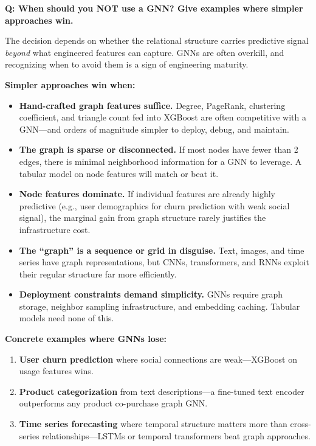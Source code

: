 \begin{interviewq}
\textbf{Q: When should you NOT use a GNN? Give examples where simpler approaches win.}

 \quad {} \quad \badgefreq{\freqmed}

\stronganswer

The decision depends on whether the relational structure carries predictive signal \textit{beyond} what engineered features can capture. GNNs are often overkill, and recognizing when to avoid them is a sign of engineering maturity.

\textbf{Simpler approaches win when:}
\begin{itemize}
    \item \textbf{Hand-crafted graph features suffice.} Degree, PageRank, clustering coefficient, and triangle count fed into XGBoost are often competitive with a GNN---and orders of magnitude simpler to deploy, debug, and maintain.
    \item \textbf{The graph is sparse or disconnected.} If most nodes have fewer than 2 edges, there is minimal neighborhood information for a GNN to leverage. A tabular model on node features will match or beat it.
    \item \textbf{Node features dominate.} If individual features are already highly predictive (e.g., user demographics for churn prediction with weak social signal), the marginal gain from graph structure rarely justifies the infrastructure cost.
    \item \textbf{The ``graph'' is a sequence or grid in disguise.} Text, images, and time series have graph representations, but CNNs, transformers, and RNNs exploit their regular structure far more efficiently.
    \item \textbf{Deployment constraints demand simplicity.} GNNs require graph storage, neighbor sampling infrastructure, and embedding caching. Tabular models need none of this.
\end{itemize}

\textbf{Concrete examples where GNNs lose:}
\begin{enumerate}
    \item \textbf{User churn prediction} where social connections are weak---XGBoost on usage features wins.
    \item \textbf{Product categorization} from text descriptions---a fine-tuned text encoder outperforms any product co-purchase graph GNN.
    \item \textbf{Time series forecasting} where temporal structure matters more than cross-series relationships---LSTMs or temporal transformers beat graph approaches.
\end{enumerate}


\end{interviewq}
